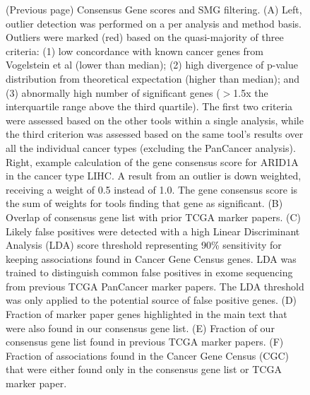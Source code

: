 \begin{figure} [t!]
  \caption[Consensus Gene scores and SMG filtering.]{(Previous page) Consensus Gene scores and SMG filtering. (A) Left, outlier detection was performed on a per analysis and method basis. Outliers were marked (red) based on the quasi-majority of three criteria: (1) low concordance with known cancer genes from Vogelstein et al (lower than median); (2) high divergence of p-value distribution from theoretical expectation (higher than median); and (3) abnormally high number of significant genes ($>$1.5x the interquartile range above the third quartile). The first two criteria were assessed based on the other tools within a single analysis, while the third criterion was assessed based on the same tool's results over all the individual cancer types (excluding the PanCancer analysis). Right, example calculation of the gene consensus score for ARID1A in the cancer type LIHC. A result from an outlier is down weighted, receiving a weight of 0.5 instead of 1.0. The gene consensus score is the sum of weights for tools finding that gene as significant. (B) Overlap of consensus gene list with prior TCGA marker papers. (C) Likely false positives were detected with a high Linear Discriminant Analysis (LDA) score threshold representing 90\% sensitivity for keeping associations found in Cancer Gene Census genes. LDA was trained to distinguish common false positives in exome sequencing from previous TCGA PanCancer marker papers. The LDA threshold was only applied to the potential source of false positive genes. (D) Fraction of marker paper genes highlighted in the main text that were also found in our consensus gene list. (E) Fraction of our consensus gene list found in previous TCGA marker papers.  (F) Fraction of associations found in the Cancer Gene Census (CGC) that were either found only in the consensus gene list or TCGA marker paper. }
\end{figure}


